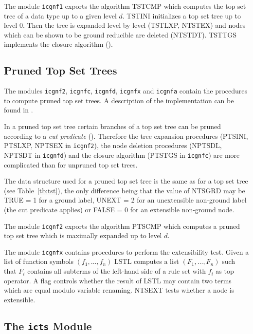 The module {\tt icgnf1} exports the algorithm TSTCMP which computes the top 
set tree of a data type up to a given level $d$.
TSTINI initializes a top set tree up to level 0.
Then the tree is expanded level by level (TSTLXP, NTSTEX) and nodes which
can be shown to be ground reducible are deleted (NTSTDT).
TSTTGS implements the closure algorithm (\cite{Buendgen:91b}).

\subsection{Pruned Top Set Trees} \label{ss:ptst}

The modules {\tt icgnf2}, {\tt icgnfc}, {\tt icgnfd}, {\tt icgnfx} and
{\tt icgnfa} contain the procedures to compute pruned top set trees.
A description of the implementation can be found in \cite{Eckhardt:91}.

In a pruned top set tree  certain branches of a top set tree can be pruned 
according to a {\em cut predicate} (\cite{Buendgen:91b}).
Therefore the tree expansion procedures (PTSINI, PTSLXP, NPTSEX in 
{\tt icgnf2}),
the node deletion procedures (NPTSDL, NPTSDT in {\tt icgnfd}) and the 
closure algorithm (PTSTGS in {\tt icgnfc}) are more complicated than for
unpruned top set trees.

The data structure used for a pruned top set tree is the same as for a
top set tree (see Table~\ref{tb:tst}), the only difference being that the 
value of NTSGRD may be TRUE = 1 for a ground label, UNEXT = 2 for an
 unextensible non-ground label (the cut predicate applies) or FALSE = 0
for an extensible non-ground node.

The module {\tt icgnf2} exports  the algorithm PTSCMP which computes a 
pruned top set tree which is maximally expanded up to level $d$.

The module {\tt icgnfx} contains procedures to perform the extensibility
test.
Given a list of function symbols $(f_1, \ldots, f_n)$ LSTL computes a list
$(F_1, \ldots, F_n)$ such that $F_i$ contains all subterms of the left-hand 
side of a rule set with $f_i$ as top operator.
A flag controls whether the result of LSTL may contain two terms which are 
equal modulo variable renaming.
NTSEXT tests whether a node is extensible.

\subsection{The {\tt icts} Module}

